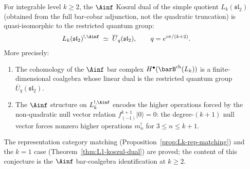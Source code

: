 \begin{conjecture}
\label{conj:Lk-koszul-dual}
For integrable level $k \ge 2$, the $\Ainf$ Koszul
dual of the simple quotient $L_k(\mathfrak{sl}_2)$
\textup{(}obtained from the full bar-cobar adjunction, not the
quadratic truncation\textup{)} is quasi-isomorphic to the
restricted quantum group:
\begin{equation}\label{eq:conj-Lk-koszul-dual}
 L_k(\mathfrak{sl}_2)^{!,\Ainf}
 \;\simeq\;
 \overline{U}_q(\mathfrak{sl}_2),
 \qquad
 q = e^{i\pi/(k+2)}.
\end{equation}
More precisely:
\begin{enumerate}[label=\textup{(\roman*)},nosep]
\item The cohomology of the $\Ainf$ bar complex
 $H^\bullet(\barB^{\mathrm{ch}}(L_k))$ is a finite-dimensional
 coalgebra whose linear dual is the restricted quantum group
 $\overline{U}_q(\mathfrak{sl}_2)$.
\item The $\Ainf$ structure on $L_k^{!,\Ainf}$ encodes the
 higher operations forced by the non-quadratic null vector
 relation $f_{(-1)}^{k+1}|0\rangle = 0$: the degree-$(k+1)$
 null vector forces nonzero higher operations $m_{n}^!$ for
 $3 \le n \le k + 1$.
\end{enumerate}
The representation category matching
\textup{(}Proposition~\textup{\ref{prop:Lk-rep-matching}}\textup{)}
and the $k = 1$ case
\textup{(}Theorem~\textup{\ref{thm:L1-koszul-dual}}\textup{)}
are proved; the content of this conjecture is the
$\Ainf$ bar-coalgebra identification at $k \ge 2$.
\end{conjecture}

